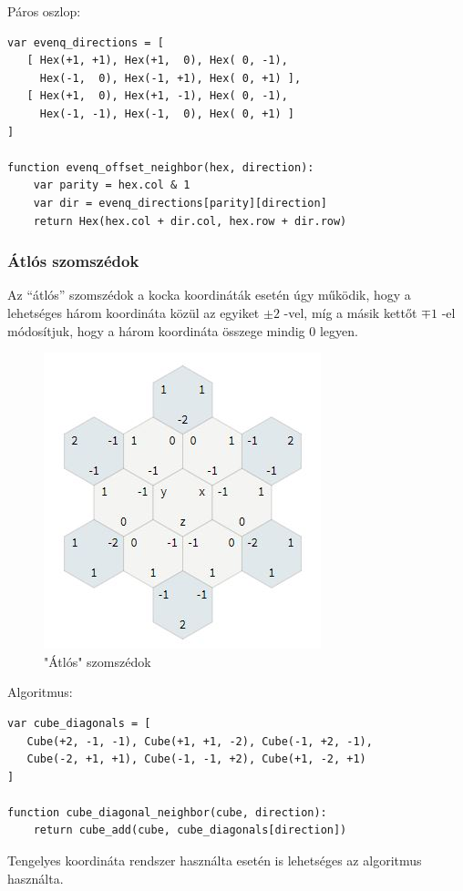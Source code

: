 Páros oszlop: 
\begin{verbatim}
var evenq_directions = [
   [ Hex(+1, +1), Hex(+1,  0), Hex( 0, -1),
     Hex(-1,  0), Hex(-1, +1), Hex( 0, +1) ],
   [ Hex(+1,  0), Hex(+1, -1), Hex( 0, -1),
     Hex(-1, -1), Hex(-1,  0), Hex( 0, +1) ]
]

function evenq_offset_neighbor(hex, direction):
    var parity = hex.col & 1
    var dir = evenq_directions[parity][direction]
    return Hex(hex.col + dir.col, hex.row + dir.row)
\end{verbatim}

\subsubsection{Átlós szomszédok}

\noindent Az “átlós” szomszédok a kocka koordináták esetén úgy működik, hogy a lehetséges három koordináta közül az egyiket $ \pm 2$ -vel, míg a másik kettőt $\mp 1$ -el módosítjuk, hogy a három koordináta összege mindig $0$ legyen.

\begin{figure}[h]
\centering
\includegraphics[scale=0.4]{kepek/img81.JPG}
\caption{"Átlós" szomszédok}
\label{fig:img81}
\end{figure}

\noindent Algoritmus:
\begin{verbatim}
var cube_diagonals = [
   Cube(+2, -1, -1), Cube(+1, +1, -2), Cube(-1, +2, -1), 
   Cube(-2, +1, +1), Cube(-1, -1, +2), Cube(+1, -2, +1)
]

function cube_diagonal_neighbor(cube, direction):
    return cube_add(cube, cube_diagonals[direction])
\end{verbatim}

\noindent Tengelyes koordináta rendszer használta esetén is lehetséges az algoritmus használta.
